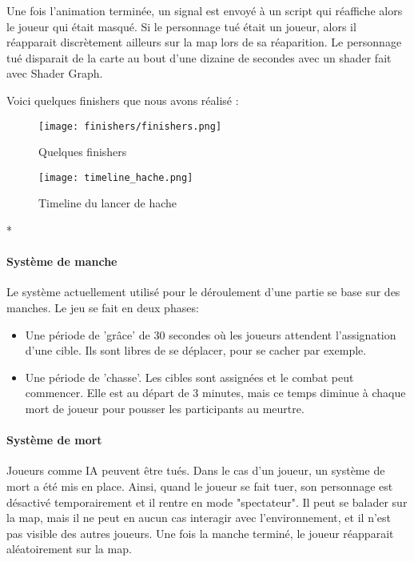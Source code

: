 			Une fois l'animation terminée, un signal est envoyé à un script qui réaffiche alors le joueur qui était masqué.
			Si le personnage tué était un joueur, alors il réapparait discrètement ailleurs sur la map lors de sa réaparition.
			Le personnage tué disparait de la carte au bout d'une dizaine de secondes avec un shader fait avec Shader Graph.

			Voici quelques finishers que nous avons réalisé :

			\begin{figure}[hbt!]
				\centering
				\texttt{[image: finishers/finishers.png]}
				\caption{Quelques finishers}
			\end{figure}

			\FloatBarrier
			\begin{figure}[hbt!]
				\centering
				\texttt{[image: timeline\_hache.png]}
				\caption{Timeline du lancer de hache}
			\end{figure}*
			\FloatBarrier


		\paragraph{Système de manche}
			Le système actuellement utilisé pour le déroulement d'une partie se base sur des manches. Le jeu se fait en deux phases:
			\begin{itemize}
				\item Une période de 'grâce' de 30 secondes où les joueurs attendent l'assignation d'une cible. Ils sont libres de se déplacer, pour se cacher par exemple.
				\item Une période de 'chasse'. Les cibles sont assignées et le combat peut commencer. Elle est au départ de 3 minutes, mais ce temps
				diminue à chaque mort de joueur pour pousser les participants au meurtre.
			\end{itemize}
		

		\paragraph{Système de mort}
			Joueurs comme IA peuvent être tués. Dans le cas d'un joueur, un système de mort a été mis en place. Ainsi,
			quand le joueur se fait tuer, son personnage est désactivé temporairement et il rentre
			en mode "spectateur". Il peut se balader sur la map, mais il ne peut en aucun cas interagir avec l'environnement,
			et il n'est pas visible des autres joueurs. Une fois la manche terminé, le joueur réapparait aléatoirement sur la map.

